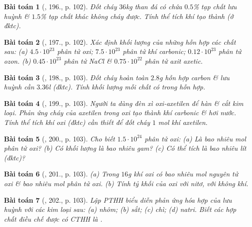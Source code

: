\documentclass{article}
\newtheorem{baitoan}{Bài toán}
\begin{document}
\begin{baitoan}[\cite{An_400_BT_Hoa_Hoc_8_2020}, 196., p. 102]
	Đốt cháy $36$\emph{kg} than đá có chứa $0.5$\% tạp chất lưu huỳnh \& $1.5$\% tạp chất khác không cháy được. Tính thể tích khí \emph{} tạo thành (ở đktc).
\end{baitoan}

\begin{baitoan}[\cite{An_400_BT_Hoa_Hoc_8_2020}, 197., p. 102]
	Xác định khối lượng của những hỗn hợp các chất sau: (a) $4.5\cdot10^{23}$ phân tử oxi; $7.5\cdot10^{23}$ phân tử khí carbonic; $0.12\cdot10^{23}$ phân tử ozon. (b) $0.45\cdot10^{23}$ phân tử \emph{NaCl} \& $0.75\cdot10^{22}$ phân tử \emph{} axit axetic.
\end{baitoan}

\begin{baitoan}[\cite{An_400_BT_Hoa_Hoc_8_2020}, 198., p. 103]
	Đốt cháy hoàn toàn $2.8$\emph{g} hỗn hợp carbon \& lưu huỳnh cần $3.36$\emph{l} \emph{} (đktc). Tính khối lượng mỗi chất có trong hỗn hợp.
\end{baitoan}

\begin{baitoan}[\cite{An_400_BT_Hoa_Hoc_8_2020}, 199., p. 103]
	Người ta dùng đèn xì oxi-axetilen để hàn \& cắt kim loại. Phản ứng cháy của axetilen \emph{} trong oxi tạo thành khí carbonic \& hơi nước. Tính thể tích khí oxi (đktc) cần thiết để đốt cháy $1$ \emph{mol} khí axetilen.
\end{baitoan}

\begin{baitoan}[\cite{An_400_BT_Hoa_Hoc_8_2020}, 200., p. 103]
	Cho biết $1.5\cdot10^{24}$ phân tử oxi: (a) Là bao nhiêu mol phân tử oxi? (b) Có khối lượng là bao nhiêu gam? (c) Có thể tích là bao nhiêu lít (đktc)?
\end{baitoan}

\begin{baitoan}[\cite{An_400_BT_Hoa_Hoc_8_2020}, 201., p. 103]
	(a) Trong $16$\emph{g} khí oxi có bao nhiêu mol nguyên tử oxi \& bao nhiêu mol phân tử oxi. (b) Tính tỷ khối của oxi với nitơ, với không khí.
\end{baitoan}

\begin{baitoan}[\cite{An_400_BT_Hoa_Hoc_8_2020}, 202., p. 103]
	Lập PTHH biểu diễn phản ứng hóa hợp của lưu huỳnh với các kim loại sau: (a) nhôm; (b) sắt; (c) chì; (d) natri. Biết các hợp chất điều chế được có CTHH là \emph{}.
\end{baitoan}
\end{document}
